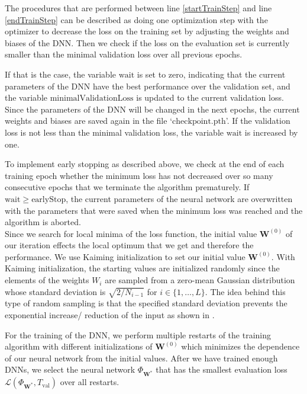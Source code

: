 The procedures that are performed between line \ref{startTrainStep} and line \ref{endTrainStep} can be described as doing one optimization step with the $\mathrm{optimizer}$ to decrease the loss on the training set by adjusting the weights and biases of the DNN. Then we check if the loss on the evaluation set is currently smaller than the minimal validation loss over all previous epochs.

If that is the case, the variable $\mathrm{wait}$ is set to zero, indicating that the current parameters of the DNN have the best performance over the validation set, and the variable $\mathrm{minimalValidationLoss}$ is updated to the current validation loss. Since the parameters of the DNN will be changed in the next epochs, the current weights and biases are saved again in the file `$\mathrm{checkpoint.pth}$'. If the validation loss is not less than the minimal validation loss, the variable $\mathrm{wait}$ is increased by one.

To implement early stopping as described above, we check at the end of each training epoch whether the minimum loss has not decreased over so many consecutive epochs that we terminate the algorithm prematurely. If $\mathrm{wait} \geq \mathrm{earlyStop}$, the current parameters of the neural network are overwritten with the parameters that were saved when the minimum loss was reached and the algorithm is aborted.\\

Since we search for local minima of the loss function, the initial value $\mathbf{W}^{(0)}$ of our iteration effects the local optimum that we get and therefore the performance. We use Kaiming initialization \cite{7410480} to set our initial value $\mathbf{W}^{(0)}$. With Kaiming initialization, the starting values are initialized randomly since the elements of the weights $W_i$ are sampled from a zero-mean Gaussian distribution whose standard deviation is $\sqrt{2/N_{i-1}}$ for $i\in\{1,\dotsc,L\}$.
The idea behind this type of random sampling is that the specified standard deviation prevents the exponential increase/ reduction of the input as shown in \cite{7410480}.

For the training of the DNN, we perform multiple restarts of the training algorithm with different initializations of $\mathbf{W}^{(0)}$ which minimizes the dependence of our neural network from the initial values. After we have trained enough DNNs, we select the neural network $\Phi_{\mathbf{W}^*}$ that has the smallest evaluation loss $\mathscr{L}(\Phi_{\mathbf{W}^*},T_\mathrm{val})$ over all restarts.

